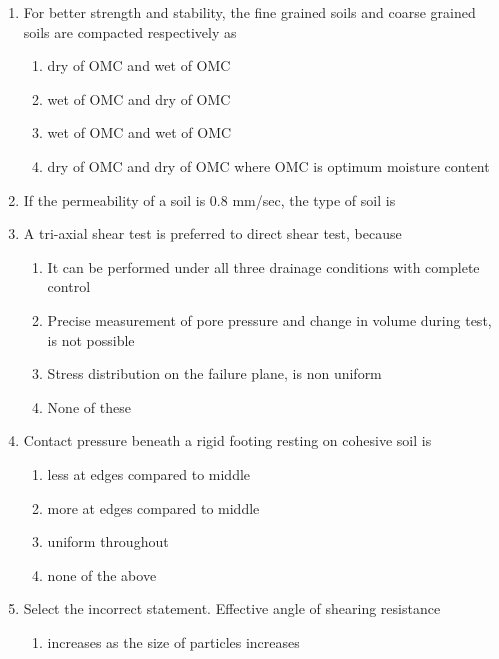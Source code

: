 \documentclass[11pt,a4paper]{article}
\begin{document}
\begin{enumerate}
\item{For better strength and stability, the fine grained soils and coarse grained soils are compacted respectively as}
\begin{enumerate}[label=\Alph*.]
\item{dry of OMC and wet of OMC}
\item{wet of OMC and dry of OMC}
\item{wet of OMC and wet of OMC}
\item{dry of OMC and dry of OMC where OMC is optimum moisture content}
\end{enumerate}
\item{If the permeability of a soil is 0.8 mm/sec, the type of soil is}
\\
\item{A tri-axial shear test is preferred to direct shear test, because}
\begin{enumerate}[label=\Alph*.]
\item{It can be performed under all three drainage conditions with complete control}
\item{Precise measurement of pore pressure and change in volume during test, is not possible}
\item{Stress distribution on the failure plane, is non uniform}
\item{None of these}
\end{enumerate}
\item{Contact pressure beneath a rigid footing resting on cohesive soil is}
\begin{enumerate}[label=\Alph*.]
\item{less at edges compared to middle}
\item{more at edges compared to middle}
\item{uniform throughout}
\item{none of the above}
\end{enumerate}
\item{Select the incorrect statement. Effective angle of shearing resistance}
\begin{enumerate}[label=\Alph*.]
\item{increases as the size of particles increases}

\end{enumerate}
\end{enumerate}
\end{document}
